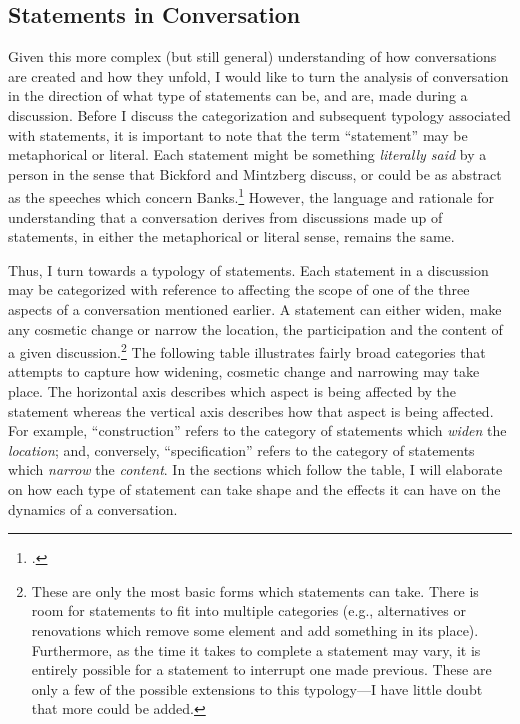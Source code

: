 \documentclass[openany,twoside]{memoir}
\begin{document}
\begin{Spacing}{2}
\section{Statements in Conversation}
Given this more complex (but still general) understanding of how conversations are created and how they unfold, I would like to turn the analysis of conversation in the direction of what type of statements can be, and are, made during a discussion.
Before I discuss the categorization and subsequent typology associated with statements, it is important to note that the term ``statement'' may be metaphorical or literal.
Each statement might be something \emph{literally said} by a person in the sense that Bickford and Mintzberg discuss, or could be as abstract as the speeches which concern Banks.\footcite{bickford96,mintzberg85,banks91}
However, the language and rationale for understanding that a conversation derives from discussions made up of statements, in either the metaphorical or literal sense, remains the same.

Thus, I turn towards a typology of statements.
Each statement in a discussion may be categorized with reference to affecting the scope of one of the three aspects of a conversation mentioned earlier.
A statement can either widen, make any cosmetic change or narrow the location, the participation and the content of a given discussion.\footnote{
These are only the most basic forms which statements can take.
There is room for statements to fit into multiple categories (e.g., alternatives or renovations which remove some element and add something in its place).
Furthermore, as the time it takes to complete a statement may vary, it is entirely possible for a statement to interrupt one made previous.
These are only a few of the possible extensions to this typology---I have little doubt that more could be added.}
The following table illustrates fairly broad categories that attempts to capture how widening, cosmetic change and narrowing may take place.
The horizontal axis describes which aspect is being affected by the statement whereas the vertical axis describes how that aspect is being affected.
For example, ``construction'' refers to the category of statements which \emph{widen} the \emph{location}; and, conversely, ``specification'' refers to the category of statements which \emph{narrow} the \emph{content}.
In the sections which follow the table, I will elaborate on how each type of statement can take shape and the effects it can have on the dynamics of a conversation.


\end{Spacing}
\end{document}
